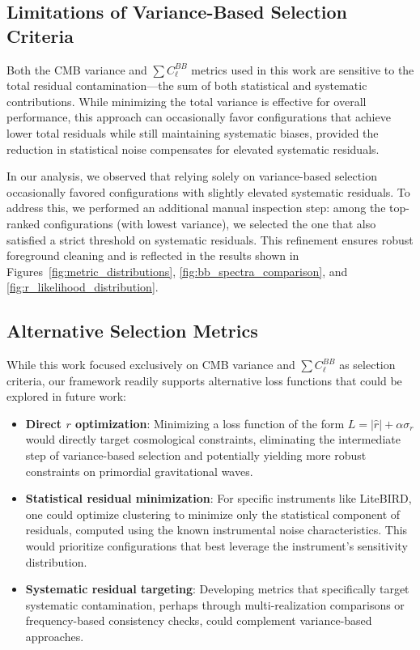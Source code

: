 \documentclass[fleqn,usenatbib]{mnras}
\begin{document}
\subsection*{Limitations of Variance-Based Selection Criteria}

Both the CMB variance and $\sum C_\ell^{BB}$ metrics used in this work are sensitive to the total residual contamination—the sum of both statistical and systematic contributions. While minimizing the total variance is effective for overall performance, this approach can occasionally favor configurations that achieve lower total residuals while still maintaining systematic biases, provided the reduction in statistical noise compensates for elevated systematic residuals. 

In our analysis, we observed that relying solely on variance-based selection occasionally favored configurations with slightly elevated systematic residuals. To address this, we performed an additional manual inspection step: among the top-ranked configurations (with lowest variance), we selected the one that also satisfied a strict threshold on systematic residuals. This refinement ensures robust foreground cleaning and is reflected in the results shown in Figures~\ref{fig:metric_distributions}, \ref{fig:bb_spectra_comparison}, and \ref{fig:r_likelihood_distribution}.

\subsection*{Alternative Selection Metrics}

While this work focused exclusively on CMB variance and $\sum C_\ell^{BB}$ as selection criteria, our framework readily supports alternative loss functions that could be explored in future work:

\begin{itemize}
    \item \textbf{Direct $r$ optimization}: Minimizing a loss function of the form $L = |\hat{r}| + \alpha \sigma_r$ would directly target cosmological constraints, eliminating the intermediate step of variance-based selection and potentially yielding more robust constraints on primordial gravitational waves.
    
    \item \textbf{Statistical residual minimization}: For specific instruments like LiteBIRD, one could optimize clustering to minimize only the statistical component of residuals, computed using the known instrumental noise characteristics. This would prioritize configurations that best leverage the instrument's sensitivity distribution.
    
    \item \textbf{Systematic residual targeting}: Developing metrics that specifically target systematic contamination, perhaps through multi-realization comparisons or frequency-based consistency checks, could complement variance-based approaches.
\end{itemize}
\end{document}
